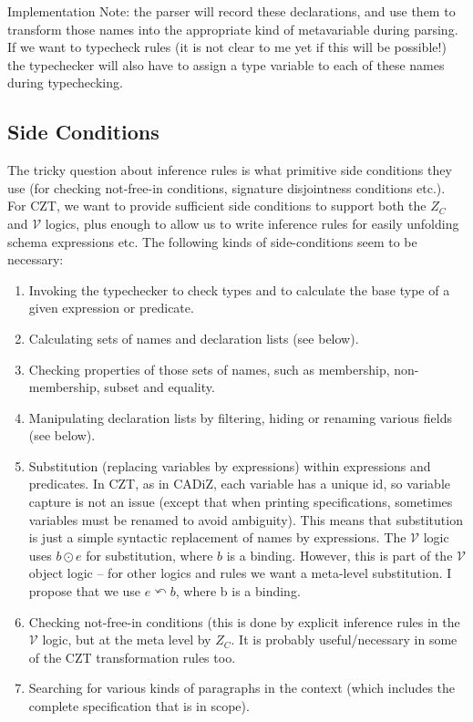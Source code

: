 \documentclass{article}
\newcommand{\V}{\mathcal{V}}
\newcommand{\substitute}{\mathrel{\curvearrowleft}}  %
\begin{document}
Implementation Note: the parser will record these declarations,
and use them to transform those names into the appropriate kind
of metavariable during parsing.  If we want to typecheck rules
(it is not clear to me yet if this will be possible!) the typechecker will
also have to assign a type variable to each of these names
during typechecking.


\subsection{Side Conditions}

The tricky question about inference rules is what primitive
side conditions they use (for checking not-free-in conditions,
signature disjointness conditions etc.).  
For CZT, we want to provide sufficient side conditions
to support both the $Z_C$ and $\V$ logics, plus enough to
allow us to write inference rules for easily unfolding schema
expressions etc.  The following kinds of side-conditions seem
to be necessary:

\begin{enumerate}
\item Invoking the typechecker to check types and to calculate
  the base type of a given expression or predicate.
\item Calculating sets of names and declaration lists (see below).
\item Checking properties of those sets of names, such as membership,
  non-membership, subset and equality.
\item Manipulating declaration lists by filtering, hiding
  or renaming various fields (see below).
\item Substitution (replacing variables by expressions)
  within expressions and predicates.  In CZT, as in CADiZ,
  each variable has a unique id, so variable capture is not an 
  issue (except that when printing specifications, sometimes
  variables must be renamed to avoid ambiguity).  This means that
  substitution is just a simple syntactic replacement of names
  by expressions.  The $\V$ logic uses $b \odot e$ for substitution,
  where $b$ is a binding.  However, this is part of the $\V$ object
  logic -- for other logics and rules we want a meta-level substitution.
  I propose that we use $e \substitute b$, where b is a binding.
\item Checking not-free-in conditions (this is done by explicit
  inference rules in the $\V$ logic, but at the meta level by $Z_C$.
  It is probably useful/necessary in some of the CZT transformation
  rules too.
\item Searching for various kinds of paragraphs in the context
  (which includes the complete specification that is in scope).
\end{enumerate}
\end{document}
